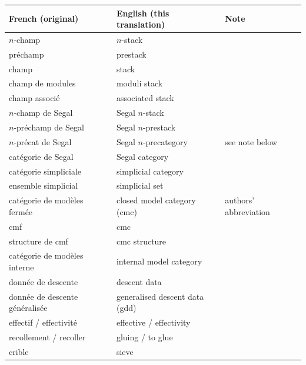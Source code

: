 \begin{table}[htbp]
  \centering
  \small
  \begin{tabular}{p{} p{} p{}}
    \hline
    \textbf{French (original)} & \textbf{English (this translation)} & \textbf{Note}\\[2pt]
    \hline
    $n$-champ                     & $n$-stack                      & \\
    préchamp                      & prestack                       & \\
    champ                         & stack                          & \\
    champ de modules              & moduli stack                   & \\
    champ associé                 & associated stack               & \\
    $n$-champ de Segal            & Segal $n$-stack                & \\
    $n$-préchamp de Segal         & Segal $n$-prestack             & \\
    $n$-précat de Segal           & Segal $n$-precategory          & see note below\\
    catégorie de Segal            & Segal category                 & \\
    catégorie simpliciale         & simplicial category            & \\
    ensemble simplicial           & simplicial set                 & \\
    catégorie de modèles fermée   & closed model category (cmc)    & authors' abbreviation\\
    cmf                           & cmc                            & \\
    structure de cmf              & cmc structure                  & \\
    catégorie de modèles interne  & internal model category        & \\
    donnée de descente            & descent data                   & \\
    donnée de descente généralisée & generalised descent data (gdd) & \\
    effectif / effectivité        & effective / effectivity        & \\
    recollement / recoller        & gluing / to glue               & \\
    crible                        & sieve                          & \\

\end{tabular}
\end{table}
